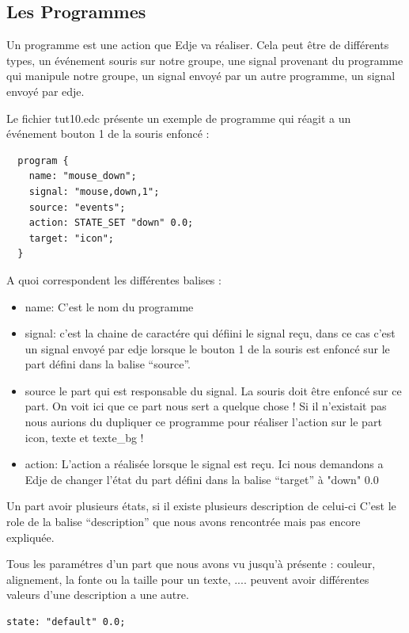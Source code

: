 \documentclass[a4paper]{efr}
\begin{document}
\subsection{Les Programmes}

Un programme est une action que Edje va réaliser. Cela peut être de différents
types, un événement souris sur notre groupe, une signal provenant du programme
qui manipule notre groupe, un signal envoyé par un autre programme, un signal
envoyé par edje.

Le fichier tut10.edc présente un exemple de programme qui réagit a un événement
bouton 1 de la souris enfoncé :

\begin{lstlisting}
  program {
    name: "mouse_down";
    signal: "mouse,down,1";
    source: "events";
    action: STATE_SET "down" 0.0;
    target: "icon";
  }
\end{lstlisting}

A quoi correspondent les différentes balises :

\begin{itemize}
\item name: C'est le nom du programme
\item signal: c'est la chaine de caractére qui défiini le signal reçu, dans ce
cas c'est un signal envoyé par edje lorsque le bouton 1 de la souris est enfoncé
sur le part défini dans la balise ``source''.
\item source le part qui est responsable  du signal. La souris doit être enfoncé sur ce
part. On voit ici que ce part nous sert a quelque chose ! Si il n'existait pas
nous aurions du dupliquer ce programme pour réaliser l'action sur le part icon,
texte et texte\_bg !
\item action: L'action a réalisée lorsque le signal est reçu. Ici nous demandons
a Edje de changer l'état du part défini dans la balise ``target'' à "down" 0.0
\end{itemize}

Un part avoir plusieurs états, si il existe plusieurs description de celui-ci
C'est le role de la balise ``description'' que nous avons rencontrée mais pas
encore expliquée.

Tous les paramétres d'un part que nous avons vu jusqu'à présente : couleur,
alignement, la fonte ou la taille pour un texte, .... peuvent avoir différentes
valeurs d'une description a une autre.

\begin{lstlisting}
state: "default" 0.0;
\end{lstlisting}
\end{document}
